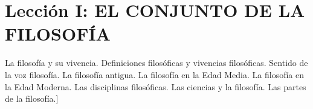 \documentclass[10pt,letterpaper]{book}
\author{Manuel Garc\'{i}a Morente}
\begin{document}
\chapter*{Lecci\'{o}n I: EL CONJUNTO DE LA FILOSOF\'{I}A}
La filosofía y su vivencia. Definiciones filosóficas y vivencias filosóficas. Sentido de la voz filosofía. La filosofía antigua.
La filosofía en la Edad Media. La filosofía en la Edad Moderna. Las disciplinas filosóficas. Las ciencias y la filosofía. Las
partes de la filosofía.]
\end{document}
